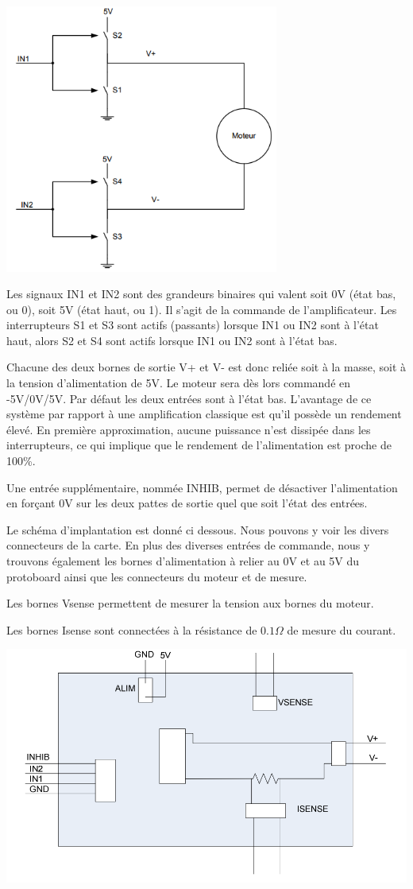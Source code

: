 \documentclass{../template/tp}
\begin{document}
\begin{center}
\includegraphics[width=9cm]{sch10}
\end{center}

Les signaux IN1 et IN2 sont des grandeurs binaires qui valent soit 0V (état bas, ou 0), soit 5V (état haut, ou 1). Il
s'agit de la commande de l'amplificateur.
Les interrupteurs S1 et S3 sont actifs (passants) lorsque IN1 ou IN2 sont à l'état haut, alors S2 et S4 sont actifs
lorsque IN1 ou IN2 sont à l'état bas.


Chacune des deux bornes de sortie V+ et V- est donc reliée soit à la masse, soit à la tension d'alimentation de
5V. Le moteur sera dès lors commandé en -5V/0V/5V. Par défaut les deux entrées sont à l'état bas.
L'avantage de ce système par rapport à une amplification classique est qu'il possède un rendement élevé. En
première approximation, aucune puissance n'est dissipée dans les interrupteurs, ce qui implique que le
rendement de l'alimentation est proche de 100\%.


Une entrée supplémentaire, nommée INHIB, permet de désactiver l'alimentation en forçant 0V sur les deux
pattes de sortie quel que soit l'état des entrées.


Le schéma d'implantation est donné ci dessous. Nous pouvons y voir les divers connecteurs de la carte. En plus
des diverses entrées de commande, nous y trouvons également les bornes d'alimentation à relier au 0V et au 5V
du protoboard ainsi que les connecteurs du moteur et de mesure.


Les bornes Vsense permettent de mesurer la tension aux bornes du moteur.


Les bornes Isense sont connectées à la résistance de $0.1\Omega$ de mesure du courant.

\begin{center}
\includegraphics[width=15cm]{sch11}
\end{center}
\end{document}
